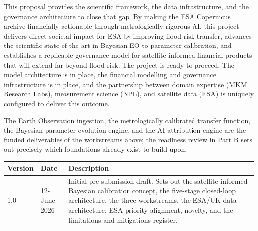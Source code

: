 \documentclass[11pt,a4paper]{article}
\begin{document}
This proposal provides the scientific framework, the data infrastructure, and the
governance architecture to close that gap. By making the ESA Copernicus archive
financially actionable through metrologically rigorous AI, this project delivers
direct societal impact for ESA by improving flood risk transfer, advances the
scientific state-of-the-art in Bayesian EO-to-parameter calibration, and
establishes a replicable governance model for satellite-informed financial products
that will extend far beyond flood risk. The project is ready to proceed. The model
architecture is in place, the financial modelling and governance infrastructure is
in place, and the partnership between domain expertise (MKM Research Labs),
measurement science (NPL), and satellite data (ESA) is uniquely configured to
deliver this outcome.

The Earth Observation ingestion, the metrologically calibrated transfer function,
the Bayesian parameter-evolution engine, and the AI attribution engine are the
funded deliverables of the workstreams above; the readiness review in Part B sets
out precisely which foundations already exist to build upon.

\mkmchangelog

\begin{tabular}{ll p{}}
\toprule
Version & Date & Description \\
\midrule
1.0 & 12-June-2026 & Initial pre-submission draft. Sets out the satellite-informed
Bayesian calibration concept, the five-stage closed-loop architecture, the three
workstreams, the ESA/UK data architecture, ESA-priority alignment, novelty, and the
limitations and mitigations register. \\
\bottomrule
\end{tabular}
\end{document}
